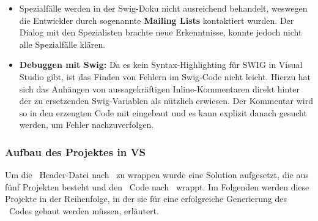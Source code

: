 \begin{itemize}
\begin{itemize}
	\end{itemize}
\item Spezialfälle werden in der Swig-Doku nicht ausreichend behandelt, weswegen die Entwickler durch sogenannte \textbf{Mailing Lists} kontaktiert wurden. Der Dialog mit den Spezialisten brachte neue Erkenntnisse, konnte jedoch nicht alle Spezialfälle klären. %
\item \textbf{Debuggen mit Swig:} Da es kein Syntax-Highlighting für SWIG in Visual Studio gibt, ist das Finden von Fehlern im Swig-Code nicht leicht. Hierzu hat sich das Anhängen von aussagekräftigen Inline-Kommentaren direkt hinter der zu ersetzenden Swig-Variablen als nützlich erwiesen. Der Kommentar wird so in den erzeugten Code mit eingebaut und es kann explizit danach gesucht werden, um Fehler nachzuverfolgen.
\end{itemize}

\subsubsection{Aufbau des Projektes in VS}\label{subsubsec:Aufbau}

Um die \CC~Header-Datei nach \CS~zu wrappen wurde eine Solution aufgesetzt, die aus fünf Projekten besteht und den \CC~Code nach \CS~wrappt. Im Folgenden werden diese Projekte in der Reihenfolge, in der sie für eine erfolgreiche Generierung des \CS~Codes gebaut werden müssen, erläutert.\\

